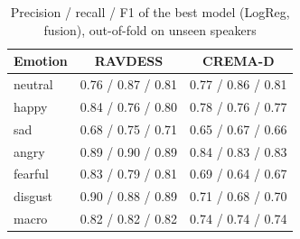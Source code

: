 \begin{table}[!t]
\centering
\caption{Precision / recall / F1 of the best model (LogReg, fusion), out-of-fold on unseen speakers}
\label{tab:prf}
\footnotesize
\begin{tabular}{@{}lcc@{}}
\toprule
\textbf{Emotion} & \textbf{RAVDESS} & \textbf{CREMA-D} \\
\midrule
neutral & 0.76 / 0.87 / 0.81 & 0.77 / 0.86 / 0.81 \\
happy & 0.84 / 0.76 / 0.80 & 0.78 / 0.76 / 0.77 \\
sad & 0.68 / 0.75 / 0.71 & 0.65 / 0.67 / 0.66 \\
angry & 0.89 / 0.90 / 0.89 & 0.84 / 0.83 / 0.83 \\
fearful & 0.83 / 0.79 / 0.81 & 0.69 / 0.64 / 0.67 \\
disgust & 0.90 / 0.88 / 0.89 & 0.71 / 0.68 / 0.70 \\
\midrule
macro & 0.82 / 0.82 / 0.82 & 0.74 / 0.74 / 0.74 \\
\bottomrule
\end{tabular}
\end{table}
